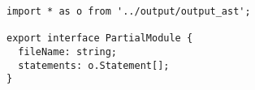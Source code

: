 \begin{verbatim}
import * as o from '../output/output_ast';

export interface PartialModule {
  fileName: string;
  statements: o.Statement[];
}
\end{verbatim}
